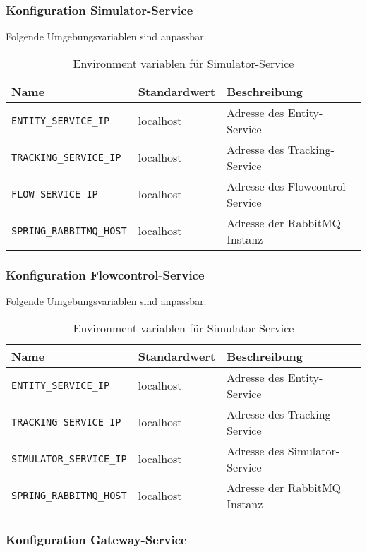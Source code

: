 \subsubsection{Konfiguration Simulator-Service}

Folgende Umgebungsvariablen sind anpassbar.

\begin{table}[h]
	\begin{tabular}{|l|l|l|}
		\hline
		Name & Standardwert & Beschreibung \\ \hline
		\verb|ENTITY_SERVICE_IP| & localhost & Adresse des Entity-Service \\ \hline
		\verb|TRACKING_SERVICE_IP| & localhost & Adresse des Tracking-Service \\ \hline
		\verb|FLOW_SERVICE_IP| & localhost & Adresse des Flowcontrol-Service \\ \hline
		\verb|SPRING_RABBITMQ_HOST| & localhost & Adresse der RabbitMQ Instanz \\ \hline		
	\end{tabular}
	\caption{Environment variablen für Simulator-Service }
\end{table}

\subsubsection{Konfiguration Flowcontrol-Service}

Folgende Umgebungsvariablen sind anpassbar.

\begin{table}[h]
	\begin{tabular}{|l|l|l|}
		\hline
		Name & Standardwert & Beschreibung \\ \hline
		\verb|ENTITY_SERVICE_IP| & localhost & Adresse des Entity-Service \\ \hline
		\verb|TRACKING_SERVICE_IP| & localhost & Adresse des Tracking-Service \\ \hline
		\verb|SIMULATOR_SERVICE_IP| & localhost & Adresse des Simulator-Service \\ \hline
		\verb|SPRING_RABBITMQ_HOST| & localhost &  Adresse der RabbitMQ Instanz \\ \hline		
	\end{tabular}
	\caption{Environment variablen für Simulator-Service }
\end{table}

\subsubsection{Konfiguration Gateway-Service}

